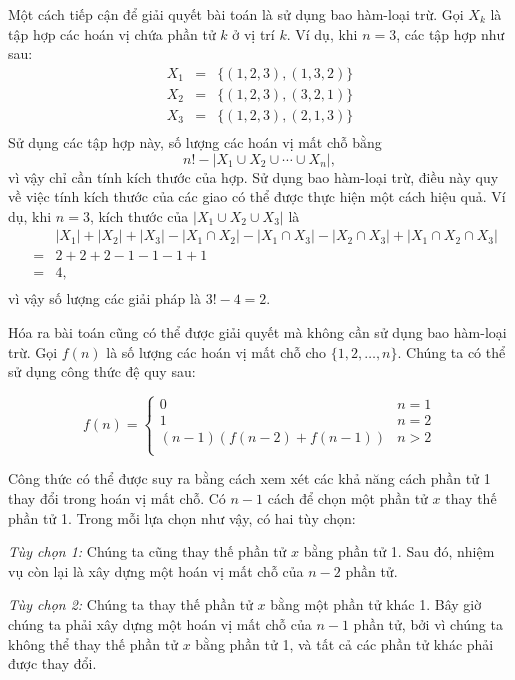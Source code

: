Một cách tiếp cận để giải quyết bài toán là sử dụng
bao hàm-loại trừ.
Gọi $X_k$ là tập hợp các hoán vị
chứa phần tử $k$ ở vị trí $k$.
Ví dụ, khi $n=3$, các tập hợp như sau:
\[
\begin{array}{lcl}
X_1 & = & \{(1,2,3),(1,3,2)\} \\
X_2 & = & \{(1,2,3),(3,2,1)\} \\
X_3 & = & \{(1,2,3),(2,1,3)\} \\
\end{array}
\]
Sử dụng các tập hợp này, số lượng các hoán vị mất chỗ bằng
\[ n! - |X_1 \cup X_2 \cup \cdots \cup X_n|, \]
vì vậy chỉ cần tính kích thước của hợp.
Sử dụng bao hàm-loại trừ, điều này quy về
việc tính kích thước của các giao có thể được
thực hiện một cách hiệu quả.
Ví dụ, khi $n=3$, kích thước của
$|X_1 \cup X_2 \cup X_3|$ là
\[
\begin{array}{lcl}
 & & |X_1| + |X_2| + |X_3| - |X_1 \cap X_2|  - |X_1 \cap X_3|  - |X_2 \cap X_3| + |X_1 \cap X_2 \cap X_3| \\
 & = & 2+2+2-1-1-1+1 \\
 & = & 4, \\
\end{array}
\]
vì vậy số lượng các giải pháp là $3!-4=2$.

Hóa ra bài toán cũng có thể được giải quyết
mà không cần sử dụng bao hàm-loại trừ.
Gọi $f(n)$ là số lượng các hoán vị mất chỗ
cho $\{1,2,\ldots,n\}$. Chúng ta có thể sử dụng
công thức đệ quy sau:

\begin{equation*}
    f(n) = \begin{cases}
               0               & n = 1\\
               1               & n = 2\\
               (n-1)(f(n-2) + f(n-1)) & n>2 \\
           \end{cases}
\end{equation*}

Công thức có thể được suy ra bằng cách xem xét
các khả năng cách phần tử 1 thay đổi
trong hoán vị mất chỗ.
Có $n-1$ cách để chọn một phần tử $x$
thay thế phần tử 1.
Trong mỗi lựa chọn như vậy, có hai tùy chọn:

\textit{Tùy chọn 1:} Chúng ta cũng thay thế phần tử $x$
bằng phần tử 1.
Sau đó, nhiệm vụ còn lại là xây dựng
một hoán vị mất chỗ của $n-2$ phần tử.

\textit{Tùy chọn 2:} Chúng ta thay thế phần tử $x$
bằng một phần tử khác 1.
Bây giờ chúng ta phải xây dựng một hoán vị mất chỗ
của $n-1$ phần tử, bởi vì chúng ta không thể thay thế
phần tử $x$ bằng phần tử 1, và tất cả các
phần tử khác phải được thay đổi.

